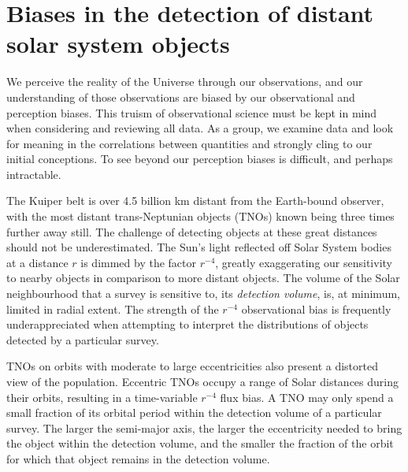 \documentclass[preprint]{aastex62}
\begin{document}
\section{Biases in the detection of distant solar system objects}
\label{sec:intro}

We perceive the reality of the Universe through our observations, and our understanding of those observations are biased by our observational and perception biases. This truism of observational science must be kept in mind when considering and reviewing all data. As a group, we examine data and look for meaning in the correlations between quantities and strongly cling to our initial conceptions.  To see beyond our perception biases is difficult, and perhaps intractable. 

The Kuiper belt is over 4.5 billion km distant from the Earth-bound observer, with the most distant trans-Neptunian objects (TNOs) known being three times further away still.  The challenge of detecting objects at these great distances should not be underestimated.  The Sun's light reflected off Solar System bodies at a distance $r$ is dimmed by the factor $r^{-4}$, greatly exaggerating our sensitivity to nearby objects in comparison to more distant objects.  The volume of the Solar neighbourhood that a survey is sensitive to, its {\it detection volume},  is, at minimum, limited in radial extent. The strength of the $r^{-4}$ observational bias is frequently underappreciated when attempting to interpret the distributions of objects detected by a particular survey.

TNOs on orbits with moderate to large eccentricities also present a distorted view of the population.  Eccentric TNOs occupy a range of Solar distances during their orbits, resulting in a time-variable $r^{-4}$ flux bias. A TNO may only spend a small fraction of its orbital period within the detection volume of a particular survey. The larger the semi-major axis, the larger the eccentricity needed to bring the object within the detection volume, and the smaller the fraction of the orbit for which that object remains in the detection volume.
\end{document}
